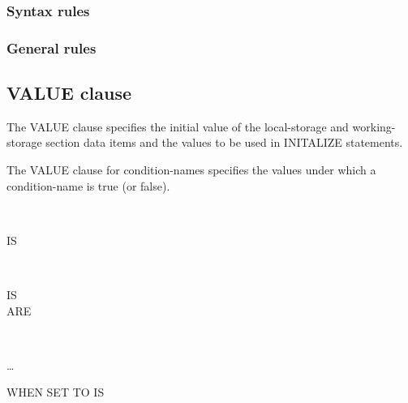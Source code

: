 \subsubsection{Syntax rules}

\subsubsection{General rules}

\subsection{VALUE clause}

The VALUE clause specifies the initial value of the local-storage and working-storage section data items and the values to be used in INITALIZE statements.

The VALUE clause for condition-names specifies the values under which a condition-name is true (or false).

\begin{syntax}
  \begin{1=}
     \\
  \end{1=}
  \begin{0-1}
    IS \\
  \end{0-1}
  \literal
\end{syntax}

\begin{syntax}
  \begin{1=}
     \\
  \end{1=}
  \begin{0-1}
    IS \\
    ARE
  \end{0-1}
  \begin{1=}
    \literal
    \begin{0-1}
      \begin{1=}
         \\
      \end{1=}
      \literal
    \end{0-1}
  \end{1=} \ldots

  \begin{0-1}
    WHEN SET TO  IS \literal
  \end{0-1}
\end{syntax}

